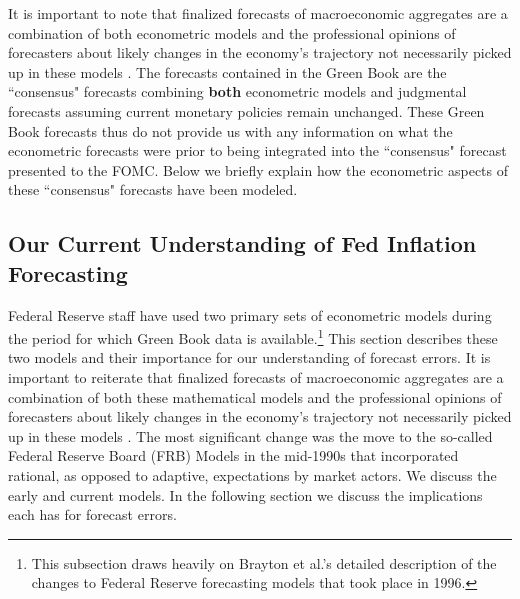 \documentclass[a4paper]{article}
\begin{document}
It is important to note that finalized forecasts of macroeconomic aggregates are a combination of both econometric models and the professional opinions of forecasters about likely changes in the economy's trajectory not necessarily picked up in these models \citep{Karamouzis1989,Reifschneider1997}. The forecasts contained in the Green Book are the ``consensus" forecasts combining {\bf{both}} econometric models and judgmental forecasts assuming current monetary policies remain unchanged. These Green Book forecasts thus do not provide us with any information on what the econometric forecasts were prior to being integrated into the ``consensus" forecast presented to the FOMC. Below we briefly explain how the econometric aspects of these ``consensus" forecasts have been modeled.

\subsection{Our Current Understanding of Fed Inflation Forecasting}

Federal Reserve staff have used two primary sets of econometric models during the period for which Green Book data is available.\footnote{This subsection draws heavily on Brayton et al.'s \cite{Brayton1997} detailed description of the changes to Federal Reserve forecasting models that took place in 1996.} This section describes these two models and their importance for our understanding of forecast errors. It is important to reiterate that finalized forecasts of macroeconomic aggregates are a combination of both these mathematical models and the professional opinions of forecasters about likely changes in the economy's trajectory not necessarily picked up in these models \citep{Karamouzis1989,Reifschneider1997,Taylor1997}. The most significant change was the move to the so-called Federal Reserve Board (FRB) Models in the mid-1990s that incorporated rational, as opposed to adaptive, expectations by market actors. We discuss the early and current models. In the following section we discuss the implications each has for forecast errors.
\end{document}
